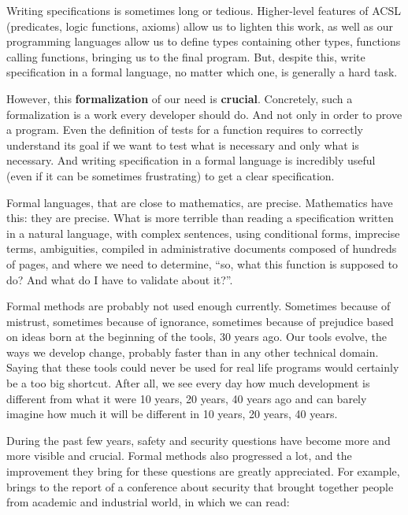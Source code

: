 Writing specifications is sometimes long or tedious. Higher-level
features of ACSL (predicates, logic functions, axioms) allow us
to lighten this work, as well as our programming languages allow us to
define types containing other types, functions calling functions, bringing
us to the final program. But, despite this, write specification in a
formal language, no matter which one, is generally a hard task.

However, this \textbf{formalization} of our need is \textbf{crucial}.
Concretely, such a formalization is a work every developer should do.
And not only in order to prove a program. Even the definition of tests
for a function requires to correctly understand its goal if we want to
test what is necessary and only what is necessary. And writing
specification in a formal language is incredibly useful (even if it can
be sometimes frustrating) to get a clear specification.

Formal languages, that are close to mathematics, are precise.
Mathematics have this: they are precise. What is more terrible than
reading a specification written in a natural language, with complex
sentences, using conditional forms, imprecise terms, ambiguities,
compiled in administrative documents composed of hundreds of pages, and
where we need to determine, ``so, what this function is supposed to do?
And what do I have to validate about it?''.

Formal methods are probably not used enough currently. Sometimes because of
mistrust, sometimes because of ignorance, sometimes because of prejudice
based on ideas born at the beginning of the tools, 30 years ago. Our tools
evolve, the ways we develop change, probably faster than in any other
technical domain. Saying that these tools could never be
used for real life programs would certainly be a too big shortcut. After
all, we see every day how much development is different from what it were
10 years, 20 years, 40 years ago and can barely imagine how much it will
be different in 10 years, 20 years, 40 years.

During the past few years, safety and security questions have become
more and more visible and crucial. Formal methods also progressed a lot,
and the improvement they bring for these questions are greatly
appreciated. For example,
 brings to the
report of a conference about security that brought together people from
academic and industrial world, in which we can read:



